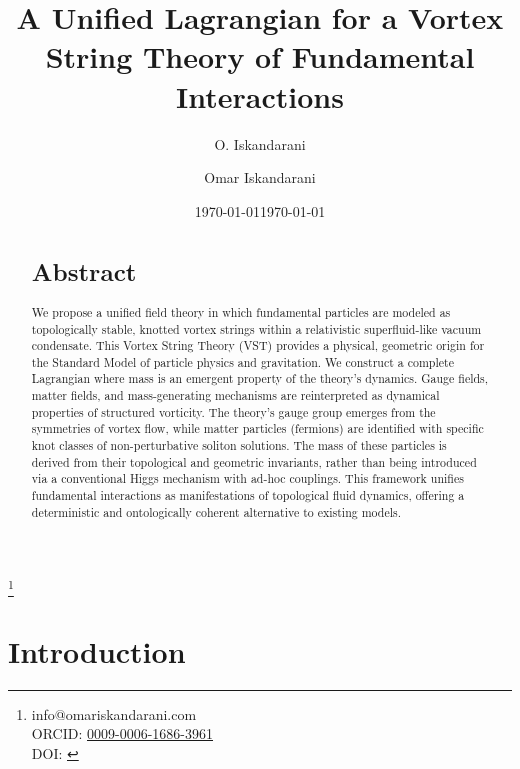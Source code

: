 \documentclass[a4paper,12pt]{article}
\title{A Unified Lagrangian for a Vortex String Theory of Fundamental Interactions}
\author{O. Iskandarani}
\affil{Independent Researcher, Groningen, The Netherlands}
\date{\today}
\begin{document}
    \title{\papertitle}
    \author{Omar Iskandarani}
    \thanks{info@omariskandarani.com \\
    ORCID: \href{https://orcid.org/0009-0006-1686-3961}{0009-0006-1686-3961} \\
    DOI: \href{https://doi.org/\paperdoi}{\paperdoi}
    }
    \date{\today}
    \thispagestyle{fancy}
    \pagestyle{fancy}
    \fancyhf{}
    \cfoot{\thepage}
    \renewcommand{\headrulewidth}{0pt}
    \begin{abstract}
        \vspace*{-0.5em}
        \section*{\centering Abstract}
        \vspace*{-1em}
        \noindent We propose a unified field theory in which fundamental particles are modeled as topologically stable, knotted vortex strings within a relativistic superfluid-like vacuum condensate. This Vortex String Theory (VST) provides a physical, geometric origin for the Standard Model of particle physics and gravitation. We construct a complete Lagrangian where mass is an emergent property of the theory's dynamics. Gauge fields, matter fields, and mass-generating mechanisms are reinterpreted as dynamical properties of structured vorticity. The theory's gauge group emerges from the symmetries of vortex flow, while matter particles (fermions) are identified with specific knot classes of non-perturbative soliton solutions. The mass of these particles is derived from their topological and geometric invariants, rather than being introduced via a conventional Higgs mechanism with ad-hoc couplings. This framework unifies fundamental interactions as manifestations of topological fluid dynamics, offering a deterministic and ontologically coherent alternative to existing models.
    \end{abstract}
    \maketitle

    \newpage

    \section{Introduction}
\end{document}
